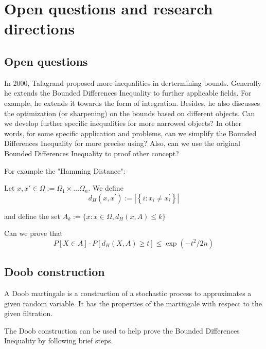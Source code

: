 

\section{Open questions and research directions}

\subsection{Open questions}

In 2000, Talagrand \cite*{talagrand:1995} proposed more inequalities in dertermining bounds. 
Generally he extends the Bounded Differences Inequality to further applicable fields. 
For example, he extends it towards the form of integration. 
Besides, he also discusses the optimization (or sharpening) on the bounds based on different objects.
Can we develop further specific inequalities for more narrowed objects? 
In other words, for some specific application and problems, can we simplify the Bounded Differences Inequality for more precise using?
Also, can we use the original Bounded Differences Inequality to proof other concept? 

For example the "Hamming Distance": \cite*{hmaji:2017}

Let $x, x' \in \Omega:= \Omega_1 \times \dots \Omega_n$. We define
    \begin{equation}
        d_{H}\left(x, x^{\prime}\right):=\left|\left\{i: x_{i} \neq x_{i}^{\prime}\right\}\right|
    \end{equation}

and define the set $A_k := \{ x: x \in \Omega, d_H (x,A) \leq k\}$


Can we prove that 
\begin{equation}
    P[X \in A] \cdot P\left[d_{H}(X, A) \geqslant t\right] \leqslant \exp \left(-t^{2} / 2 n\right)
\end{equation}

\subsection{Doob construction}
A Doob martingale is a construction of a stochastic process to approximates a given random variable.
It has the properties of the martingale with respect to the given filtration. 

The Doob construction can be used to help prove the Bounded Differences Inequality by following brief steps. \cite*{Bartlett:2020}

